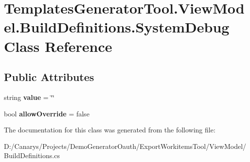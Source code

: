 \hypertarget{class_templates_generator_tool_1_1_view_model_1_1_build_definitions_1_1_system_debug}{}\section{Templates\+Generator\+Tool.\+View\+Model.\+Build\+Definitions.\+System\+Debug Class Reference}
\label{class_templates_generator_tool_1_1_view_model_1_1_build_definitions_1_1_system_debug}
\subsection*{Public Attributes}
\begin{DoxyCompactItemize}
\item 
\mbox{\label{class_templates_generator_tool_1_1_view_model_1_1_build_definitions_1_1_system_debug_a1798973692e40e4343ee1335f7da083d}} 
string {\bfseries value} = \char`\"{}\char`\"{}
\item 
\mbox{\label{class_templates_generator_tool_1_1_view_model_1_1_build_definitions_1_1_system_debug_abc55294c8d8e2d3a4bcefc2686b0be39}} 
bool {\bfseries allow\+Override} = false
\end{DoxyCompactItemize}


The documentation for this class was generated from the following file\+:\begin{DoxyCompactItemize}
\item 
D\+:/\+Canarys/\+Projects/\+Demo\+Generator\+Oauth/\+Export\+Workitems\+Tool/\+View\+Model/Build\+Definitions.\+cs\end{DoxyCompactItemize}
